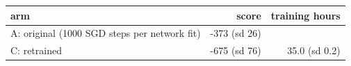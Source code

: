 \begin{tabular}{lrr}
\toprule
arm & score & training hours \\
\midrule
A: original (1000 SGD steps per network fit) & -373 (sd 26) &  \\
C: retrained & -675 (sd 76) & 35.0 (sd 0.2) \\
\bottomrule
\end{tabular}
